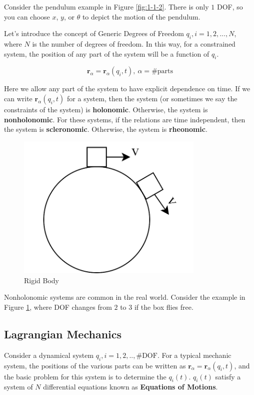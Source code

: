 \documentclass{article}
\theoremstyle{definition}
\theoremstyle{plain}
\theoremstyle{remark}
\begin{document}
Consider the pendulum example in Figure \ref{fig:1-1-2}. There is only $1$ DOF, so you can choose $x$, $y$, or $\theta$ to depict the motion of the pendulum.

Let's introduce the concept of Generic Degrees of Freedom $q_i, i=1, 2, ..., N$, where $N$ is the number of degrees of freedom. In this way, for a constrained system, the position of any part of the system will be a function of $q_i$.

\[
    \mathbf{r}_\alpha = \mathbf{r}_\alpha(q_i, t),\ \alpha=\text{\# parts}
\]

Here we allow any part of the system to have explicit dependence on time. If we can write $\mathbf{r}_\alpha(q_i, t)$ for a system, then the system (or sometimes we say the constraints of the system) is \textbf{holonomic}. Otherwise, the system is  \textbf{nonholonomic}. For these systems, if the relations are time independent, then the system is \textbf{scleronomic}. Otherwise, the system is \textbf{rheonomic}. 

\begin{figure}[h]
  \centering
  \includegraphics[width=0.8\textwidth]{images/1-1-3.png}
  \caption{Rigid Body}
  \label{fig:1-1-3}
\end{figure}

Nonholonomic systems are common in the real world. Consider the example in Figure \ref{fig:1-1-3}, where DOF changes from $2$ to $3$ if the box flies free.

\subsection{Lagrangian Mechanics}

Consider a dynamical system $q_i, i=1,2,..,\text{\# DOF}$. For a typical mechanic system, the positions of the various parts can be written as $\mathbf{r}_\alpha=\mathbf{r}_\alpha(q_i, t)$, and the basic problem for this system is to determine the $q_i(t)$. $q_i(t)$ satisfy a system of $N$ differential equations known as \textbf{Equations of Motions}.
\end{document}
